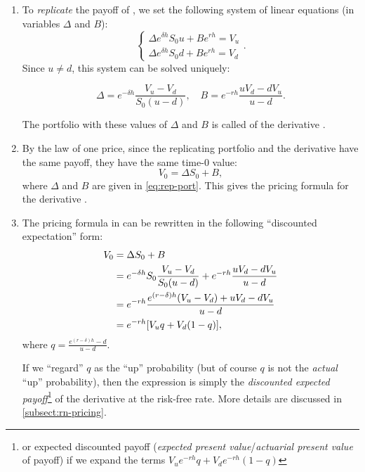 \begin{enumerate}
\item \label{it:rep-port}
To \emph{replicate} the payoff of , we set the following
system of linear equations (in variables \(\Delta\) and \(B\)):
\[
\begin{cases}
\Delta e^{\delta h}S_0u+Be^{rh}=V_u\\
\Delta e^{\delta h}S_0d+Be^{rh}=V_d
\end{cases}.
\]
Since \(u\ne d\), this system can be solved uniquely:

\begin{equation}
\label{eq:rep-port}
\Delta=e^{-\delta h}\frac{V_u-V_d}{S_0(u-d)},\quad B=e^{-rh}\frac{uV_d-dV_u}{u-d}.
\end{equation}

The portfolio with these values of \(\Delta\) and \(B\) is called
 of the derivative .

\item \label{it:price-by-rep-fmla}
By the law of one price, since the replicating portfolio and the
derivative  have the same payoff, they have the same time-0 value:
\[
V_0=\Delta S_0+B,
\]
where \(\Delta\) and \(B\) are given in \cref{eq:rep-port}. This gives the
pricing formula for the derivative .

\item \label{it:price-by-rep-fmla-exp-form}
The pricing formula in  can be rewritten
in the following ``discounted expectation'' form:
\begin{align*}
V_0&=\Delta S_0+B\\
&=e^{-\delta h}S_0\frac{V_u-V_d}{S_0(u-d)}+e^{-rh}\frac{uV_d-dV_u}{u-d}\\
&=e^{-rh}\frac{e^{(r-\delta)h}(V_u-V_d)+uV_d-dV_u}{u-d}\\
&=e^{-rh}\qty[V_uq+V_d(1-q)],
\end{align*}
where \(\displaystyle q=\frac{e^{(r-\delta)h}-d}{u-d}\). 

If we ``regard'' \(q\) as the ``up'' probability (but of course \(q\) is not
the \emph{actual} ``up'' probability), then the expression is simply the
\emph{discounted expected payoff}\footnote{or expected discounted payoff
(\emph{expected present value}/\emph{actuarial present value} of payoff) if we
expand the terms  \(V_ue^{-rh}q+V_de^{-rh}(1-q)\)} of the
derivative  at the risk-free rate. More details are discussed in
\cref{subsect:rn-pricing}.


\end{enumerate}
